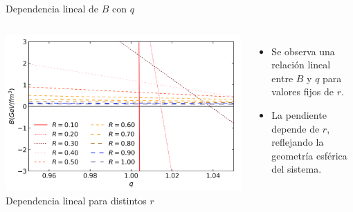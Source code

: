 \documentclass{beamer}
\begin{document}
\begin{frame}{Dependencia lineal de \( B \) con \( q \)}
  \begin{columns}
    \includegraphics[width=\linewidth]{figures/B(q)-different-r-cuts.png}
    \vspace{0.1cm}
    \centering \scriptsize{Dependencia lineal para distintos \( r \)}

    \begin{itemize}
      \item Se observa una relación lineal entre \( B \) y \( q \) para valores fijos de \( r \).
      \item La pendiente depende de \( r \), reflejando la geometría esférica del sistema.
    \end{itemize}
  \end{columns}
\end{frame}
\end{document}
